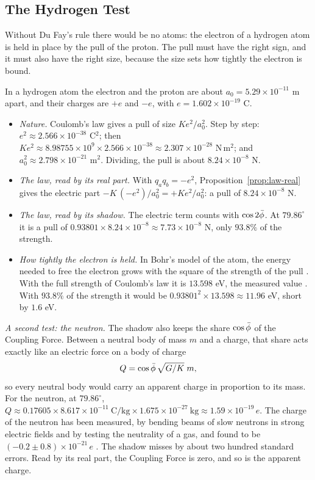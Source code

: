 \subsection{The Hydrogen Test}\label{subsec:test-sign}

Without Du Fay's rule there would be no atoms: the electron of a hydrogen atom is held in place by the pull of the proton. The pull must have the right sign, and it must also have the right size, because the size sets how tightly the electron is bound.

\begin{workedexample}
In a hydrogen atom the electron and the proton are about $a_0 = 5.29 \times 10^{-11}$ m apart, and their charges are $+e$ and $-e$, with $e = 1.602 \times 10^{-19}$ C.
\begin{itemize}
  \item \emph{Nature.} Coulomb's law gives a pull of size $K e^2/a_0^2$. Step by step: $e^2 \approx 2.566 \times 10^{-38}$ C$^2$; then $K e^2 \approx 8.98755 \times 10^{9} \times 2.566 \times 10^{-38} \approx 2.307 \times 10^{-28}$ N\,m$^2$; and $a_0^2 \approx 2.798 \times 10^{-21}$ m$^2$. Dividing, the pull is about $8.24 \times 10^{-8}$ N.
  \item \emph{The law, read by its real part.} With $q_a q_b = -e^2$, Proposition~\ref{prop:law-real} gives the electric part $-K\,(-e^2)/a_0^2 = +K e^2/a_0^2$: a pull of $8.24 \times 10^{-8}$ N.
  \item \emph{The law, read by its shadow.} The electric term counts with $\cos 2\bar{\phi}$. At $79.86^\circ$ it is a pull of $0.93801 \times 8.24 \times 10^{-8} \approx 7.73 \times 10^{-8}$ N, only $93.8\%$ of the strength.
  \item \emph{How tightly the electron is held.} In Bohr's model of the atom, the energy needed to free the electron grows with the square of the strength of the pull \citep{Bohr1913}. With the full strength of Coulomb's law it is $13.598$ eV, the measured value \citep{Sansonetti2005}. With $93.8\%$ of the strength it would be $0.93801^2 \times 13.598 \approx 11.96$ eV, short by $1.6$ eV.
\end{itemize}
\end{workedexample}

\emph{A second test: the neutron.} The shadow also keeps the share $\cos\bar{\phi}$ of the Coupling Force. Between a neutral body of mass $m$ and a charge, that share acts exactly like an electric force on a body of charge
\[
Q = \cos\bar{\phi}\,\sqrt{G/K}\;m ,
\]
so every neutral body would carry an apparent charge in proportion to its mass. For the neutron, at $79.86^\circ$, $Q \approx 0.17605 \times 8.617 \times 10^{-11}\ \mathrm{C/kg} \times 1.675 \times 10^{-27}\ \mathrm{kg} \approx 1.59 \times 10^{-19}\,e$. The charge of the neutron has been measured, by bending beams of slow neutrons in strong electric fields and by testing the neutrality of a gas, and found to be $(-0.2 \pm 0.8) \times 10^{-21}\,e$ \citep{Baumann1988,Bressi2011,PDG2024}. The shadow misses by about two hundred standard errors. Read by its real part, the Coupling Force is zero, and so is the apparent charge.

